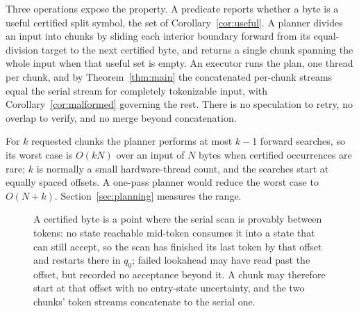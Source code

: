 \documentclass[11pt,a4paper]{article}
\theoremstyle{definition}
\theoremstyle{plain}
\begin{document}
Three operations expose the property. A predicate reports whether a byte is a useful certified split symbol, the set
of Corollary~\ref{cor:useful}. A planner divides an input into chunks by sliding each interior boundary forward from
its equal-division target to the next certified byte, and returns a single chunk spanning the whole input when that
useful set is empty. An executor runs the plan, one thread per chunk, and by Theorem~\ref{thm:main} the concatenated
per-chunk streams equal the serial stream for completely tokenizable input, with Corollary~\ref{cor:malformed}
governing the rest. There is no speculation to retry, no overlap to verify, and no merge beyond concatenation.

For $k$ requested chunks the planner performs at most $k-1$ forward searches, so its worst case is $O(kN)$ over an
input of $N$ bytes when certified occurrences are rare; $k$ is normally a small hardware-thread count, and the
searches start at equally spaced offsets. A one-pass planner would reduce the worst case to $O(N + k)$.
Section~\ref{sec:planning} measures the range.

\begin{figure}[t]
\centering
{}
\caption{A certified byte is a point where the serial scan is provably between tokens: no state reachable mid-token
consumes it into a state that can still accept, so the scan has finished its last token by that offset and restarts
there in $q_0$; failed lookahead may have read past the offset, but recorded no acceptance beyond it. A chunk may
therefore start at that offset with no entry-state uncertainty, and the two chunks' token streams concatenate to the
serial one.}
\label{fig:split}
\end{figure}
\end{document}
